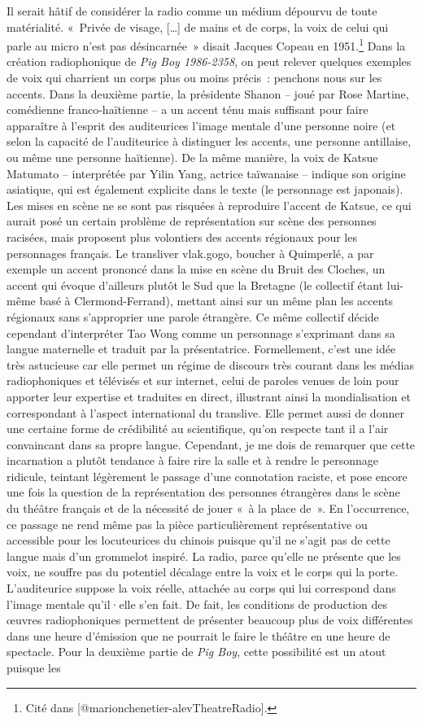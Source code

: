 \documentclass[
]{article}
\begin{document}
Il serait hâtif de considérer la radio comme un médium dépourvu de toute matérialité. «~Privée de visage, {[}\ldots{]} de mains et de corps, la voix de celui qui parle au micro n'est pas désincarnée~» disait Jacques Copeau en 1951.\footnote{Cité dans {[}@marionchenetier-alevTheatreRadio{]}.} Dans la création radiophonique de \emph{Pig Boy 1986-2358}, on peut relever quelques exemples de voix qui charrient un corps plus ou moins précis~: penchons nous sur les accents. Dans la deuxième partie, la présidente Shanon -- joué par Rose Martine, comédienne franco-haïtienne -- a un accent ténu mais suffisant pour faire apparaître à l'esprit des auditeurices l'image mentale d'une personne noire (et selon la capacité de l'auditeurice à distinguer les accents, une personne antillaise, ou même une personne haïtienne). De la même manière, la voix de Katsue Matumato -- interprétée par Yilin Yang, actrice taïwanaise -- indique son origine asiatique, qui est également explicite dans le texte (le personnage est japonais). Les mises en scène ne se sont pas risquées à reproduire l'accent de Katsue, ce qui aurait posé un certain problème de représentation sur scène des personnes racisées, mais proposent plus volontiers des accents régionaux pour les personnages français. Le transliver vlak.gogo, boucher à Quimperlé, a par exemple un accent prononcé dans la mise en scène du Bruit des Cloches, un accent qui évoque d'ailleurs plutôt le Sud que la Bretagne (le collectif étant lui-même basé à Clermond-Ferrand), mettant ainsi sur un même plan les accents régionaux sans s'approprier une parole étrangère. Ce même collectif décide cependant d'interpréter Tao Wong comme un personnage s'exprimant dans sa langue maternelle et traduit par la présentatrice. Formellement, c'est une idée très astucieuse car elle permet un régime de discours très courant dans les médias radiophoniques et télévisés et sur internet, celui de paroles venues de loin pour apporter leur expertise et traduites en direct, illustrant ainsi la mondialisation et correspondant à l'aspect international du translive. Elle permet aussi de donner une certaine forme de crédibilité au scientifique, qu'on respecte tant il a l'air convaincant dans sa propre langue. Cependant, je me dois de remarquer que cette incarnation a plutôt tendance à faire rire la salle et à rendre le personnage ridicule, teintant légèrement le passage d'une connotation raciste, et pose encore une fois la question de la représentation des personnes étrangères dans le scène du théâtre français et de la nécessité de jouer «~à la place de~». En l'occurrence, ce passage ne rend même pas la pièce particulièrement représentative ou accessible pour les locuteurices du chinois puisque qu'il ne s'agit pas de cette langue mais d'un grommelot inspiré. La radio, parce qu'elle ne présente que les voix, ne souffre pas du potentiel décalage entre la voix et le corps qui la porte. L'auditeurice suppose la voix réelle, attachée au corps qui lui correspond dans l'image mentale qu'il·elle s'en fait. De fait, les conditions de production des œuvres radiophoniques permettent de présenter beaucoup plus de voix différentes dans une heure d'émission que ne pourrait le faire le théâtre en une heure de spectacle. Pour la deuxième partie de \emph{Pig Boy}, cette possibilité est un atout puisque les 
\end{document}
